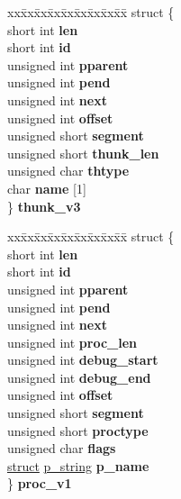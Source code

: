 \begin{DoxyCompactItemize}
\begin{tabbing}
\end{tabbing}\item 
\mbox{\label{unioncodeview__symbol_a5972051fe43fcb59593d44731a167e6f}} 
\begin{tabbing}
xx\=xx\=xx\=xx\=xx\=xx\=xx\=xx\=xx\=\kill
struct \{\\
\>short int {\bfseries len}\\
\>short int {\bfseries id}\\
\>unsigned int {\bfseries pparent}\\
\>unsigned int {\bfseries pend}\\
\>unsigned int {\bfseries next}\\
\>unsigned int {\bfseries offset}\\
\>unsigned short {\bfseries segment}\\
\>unsigned short {\bfseries thunk\_len}\\
\>unsigned char {\bfseries thtype}\\
\>char {\bfseries name} \mbox{[}1\mbox{]}\\
\} {\bfseries thunk\_v3}\\

\end{tabbing}\item 
\mbox{\label{unioncodeview__symbol_a79aaa0bd58e664da8e8d43ff02bceddd}} 
\begin{tabbing}
xx\=xx\=xx\=xx\=xx\=xx\=xx\=xx\=xx\=\kill
struct \{\\
\>short int {\bfseries len}\\
\>short int {\bfseries id}\\
\>unsigned int {\bfseries pparent}\\
\>unsigned int {\bfseries pend}\\
\>unsigned int {\bfseries next}\\
\>unsigned int {\bfseries proc\_len}\\
\>unsigned int {\bfseries debug\_start}\\
\>unsigned int {\bfseries debug\_end}\\
\>unsigned int {\bfseries offset}\\
\>unsigned short {\bfseries segment}\\
\>unsigned short {\bfseries proctype}\\
\>unsigned char {\bfseries flags}\\
\>\hyperlink{interfacestruct}{struct} \hyperlink{structp__string}{p\_string} {\bfseries p\_name}\\
\} {\bfseries proc\_v1}\\


\end{tabbing}
\end{DoxyCompactItemize}
